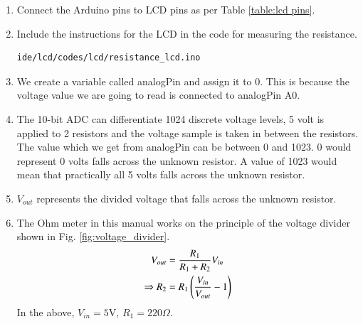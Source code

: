 \begin{enumerate}[label=\arabic*.,ref=\theenumi]
%
%
%
\item
Connect the Arduino pins to LCD pins as per Table \ref{table:lcd pins}.
%
\item
Include the instructions for the LCD in the code for measuring the resistance. 
\solution 
%
		\begin{lstlisting}
ide/lcd/codes/lcd/resistance_lcd.ino
		\end{lstlisting}
\item We create a variable called analogPin and assign it to 0. 
This is because the voltage value we are going to read is connected to analogPin A0.
\item  The 10-bit ADC can differentiate 1024 discrete voltage levels, 5 volt is applied to 2 resistors and the voltage sample is taken in between the resistors. The value which we get from analogPin can be between 0 and 1023. 0 would represent 0 volts falls across the unknown resistor. A value of 1023 would mean that practically all 5 volts falls across the unknown resistor.
\item  $V_{out}$ represents the divided voltage that falls across the unknown resistor.
\item  The Ohm meter in this manual works on the principle of the voltage divider shown in Fig. \ref{fig:voltage_divider}.
%
\begin{align}
V_{out}&=\frac{R_1}{R_1+R_2}V_{in} \\
\Rightarrow R_2&=R_1\left(\frac{V_{in}}{V_{out}}-1\right)
\end{align}
%
In the above, $V_{in} = 5$V, $R_1 = 220 \Omega$.
\end{enumerate}



